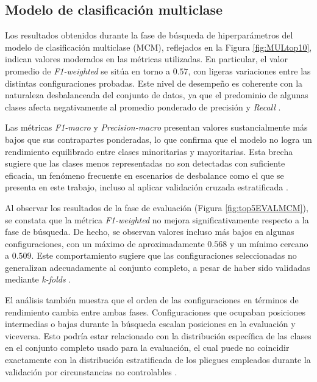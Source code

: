 \subsection{Modelo de clasificación multiclase}

Los resultados obtenidos durante la fase de búsqueda de hiperparámetros del modelo de clasificación multiclase (MCM), reflejados en la Figura \ref{fig:MULtop10}, indican valores moderados en las métricas utilizadas. En particular, el valor promedio de \textit{F1-weighted} se sitúa en torno a $0{.}57$, con ligeras variaciones entre las distintas configuraciones probadas. Este nivel de desempeño es coherente con la naturaleza desbalanceada del conjunto de datos, ya que el predominio de algunas clases afecta negativamente al promedio ponderado de precisión y \textit{Recall} \cite{he2009learning}.

Las métricas \textit{F1-macro} y \textit{Precision-macro} presentan valores sustancialmente más bajos que sus contrapartes ponderadas, lo que confirma que el modelo no logra un rendimiento equilibrado entre clases minoritarias y mayoritarias. Esta brecha sugiere que las clases menos representadas no son detectadas con suficiente eficacia, un fenómeno frecuente en escenarios de desbalance como el que se presenta en este trabajo, incluso al aplicar validación cruzada estratificada \cite{johnson2019survey}.

Al observar los resultados de la fase de evaluación (Figura \ref{fig:top5EVALMCM}), se constata que la métrica \textit{F1-weighted} no mejora significativamente respecto a la fase de búsqueda. De hecho, se observan valores incluso más bajos en algunas configuraciones, con un máximo de aproximadamente $0{.}568$ y un mínimo cercano a $0{.}509$. Este comportamiento sugiere que las configuraciones seleccionadas no generalizan adecuadamente al conjunto completo, a pesar de haber sido validadas mediante \textit{k-folds} \cite{reimers2017optimal}.

El análisis también muestra que el orden de las configuraciones en términos de rendimiento cambia entre ambas fases. Configuraciones que ocupaban posiciones intermedias o bajas durante la búsqueda escalan posiciones en la evaluación y viceversa. Esto podría estar relacionado con la distribución específica de las clases en el conjunto completo usado para la evaluación, el cual puede no coincidir exactamente con la distribución estratificada de los pliegues empleados durante la validación por circunstancias no controlables \cite{buda2018systematic}.

